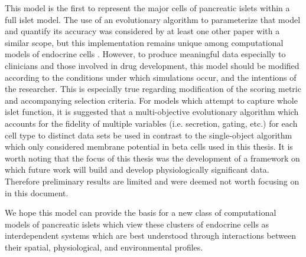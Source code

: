 This model is the first to represent the major cells of pancreatic islets within a full islet model. The use of an evolutionary algorithm to parameterize that model and quantify its accuracy was considered by at least one other paper with a similar scope, but this implementation remains unique among computational models of endocrine cells \cite{gurkiewicz_numerical_2007}. However, to produce meaningful data especially to clinicians and those involved in drug development, this model should be modified according to the conditions under which simulations occur, and the intentions of the researcher. This is especially true regarding modification of the scoring metric and accompanying selection criteria. For models which attempt to capture whole islet function, it is suggested that a multi-objective evolutionary algorithm which accounts for the fidelity of multiple variables (i.e. secretion, gating, etc.) for each cell type to distinct data sets be used in contrast to the single-object algorithm which only considered membrane potential in beta cells used in this thesis. It is worth noting that the focus of this thesis was the development of a framework on which future work will build and develop physiologically significant data. Therefore preliminary results are limited and were deemed not worth focusing on in this document.
\par We hope this model can provide the basis for a new class of computational models of pancreatic islets which view these clusters of endocrine cells as interdependent systems which are best understood through interactions between their spatial, physiological, and environmental profiles.
\clearpage
